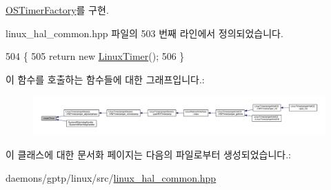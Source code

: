 \hyperlink{class_o_s_timer_factory_a93317f4dabe911276934eeb0a18591a5}{O\+S\+Timer\+Factory}를 구현.



linux\+\_\+hal\+\_\+common.\+hpp 파일의 503 번째 라인에서 정의되었습니다.


\begin{DoxyCode}
504     \{
505         \textcolor{keywordflow}{return} \textcolor{keyword}{new} \hyperlink{class_linux_timer}{LinuxTimer}();
506     \}
\end{DoxyCode}


이 함수를 호출하는 함수들에 대한 그래프입니다.\+:
\nopagebreak
\begin{figure}[H]
\begin{center}
\leavevmode
\includegraphics[width=350pt]{class_linux_timer_factory_aa860b8a3f499753959b9148bf48cda4d_icgraph}
\end{center}
\end{figure}




이 클래스에 대한 문서화 페이지는 다음의 파일로부터 생성되었습니다.\+:\begin{DoxyCompactItemize}
\item 
daemons/gptp/linux/src/\hyperlink{linux__hal__common_8hpp}{linux\+\_\+hal\+\_\+common.\+hpp}\end{DoxyCompactItemize}
